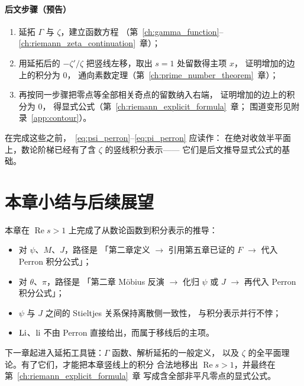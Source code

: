 \paragraph{后文步骤（预告）}
\begin{enumerate}
  \item 延拓 $\Gamma$ 与 $\zeta$，建立函数方程
        （第~\ref{ch:gamma_function}--\ref{ch:riemann_zeta_continuation}~章）；
  \item 用延拓后的 $-\zeta'/\zeta$ 把竖线左移，取出 $s=1$ 处留数得主项 $x$，
        证明增加的边上的积分为 $0$，
        通向素数定理（第~\ref{ch:prime_number_theorem}~章）；
  \item 再按同一步骤把零点等全部相关奇点的留数纳入右端，
        证明增加的边上的积分为 $0$，
        得显式公式（第~\ref{ch:riemann_explicit_formula}~章；
        围道变形见附录~\ref{app:contour}）。
\end{enumerate}

在完成这些之前，~\eqref{eq:psi_perron}--\eqref{eq:pi_perron} 应读作：
在绝对收敛半平面上，数论阶梯已经有了含 $\zeta$ 的竖线积分表示——
它们是后文推导显式公式的基础。


\section*{本章小结与后续展望}
\label{sec:summary_discrete_continuous}

本章在 $\operatorname{Re}s>1$ 上完成了从数论函数到积分表示的推导：

\begin{itemize}
  \item 对 $\psi$、$M$、$J$，路径是
        「第二章定义 $\to$ 引用第五章已证的 $F$ $\to$ 代入 Perron 积分公式」；
  \item 对 $\theta$、$\pi$，路径是
        「第二章 Möbius 反演 $\to$ 化归 $\psi$ 或 $J$ $\to$ 再代入 Perron 积分公式」；
  \item $\psi$ 与 $J$ 之间的 Stieltjes 关系保持离散侧一致性，
        与积分表示并行不悖；
  \item $\operatorname{Li}$、$\operatorname{li}$ 不由 Perron 直接给出，而属于移线后的主项。
\end{itemize}

下一章起进入延拓工具链：$\Gamma$ 函数、解析延拓的一般定义，
以及 $\zeta$ 的全平面理论。有了它们，才能把本章竖线上的积分
合法地移出 $\operatorname{Re}s>1$，并最终在第~\ref{ch:riemann_explicit_formula}~章
写成含全部非平凡零点的显式公式。
